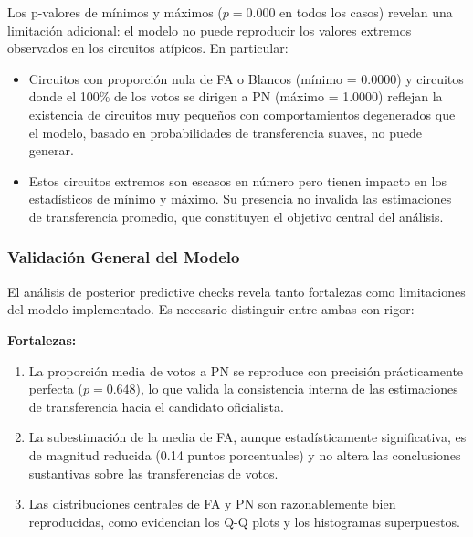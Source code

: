 Los p-valores de m\'inimos y m\'aximos ($p = 0.000$ en todos los casos) revelan una limitaci\'on adicional: el modelo no puede reproducir los valores extremos observados en los circuitos at\'ipicos. En particular:

\begin{itemize}
    \item Circuitos con proporci\'on nula de FA o Blancos (m\'inimo = 0.0000) y circuitos donde el 100\% de los votos se dirigen a PN (m\'aximo = 1.0000) reflejan la existencia de circuitos muy peque\~nos con comportamientos degenerados que el modelo, basado en probabilidades de transferencia suaves, no puede generar.

    \item Estos circuitos extremos son escasos en n\'umero pero tienen impacto en los estad\'isticos de m\'inimo y m\'aximo. Su presencia no invalida las estimaciones de transferencia promedio, que constituyen el objetivo central del an\'alisis.
\end{itemize}

\subsubsection{Validaci\'on General del Modelo}

El an\'alisis de posterior predictive checks revela tanto fortalezas como limitaciones del modelo implementado. Es necesario distinguir entre ambas con rigor:

\textbf{Fortalezas:}
\begin{enumerate}
    \item La proporci\'on media de votos a PN se reproduce con precisi\'on pr\'acticamente perfecta ($p = 0.648$), lo que valida la consistencia interna de las estimaciones de transferencia hacia el candidato oficialista.

    \item La subestimaci\'on de la media de FA, aunque estad\'isticamente significativa, es de magnitud reducida (0.14 puntos porcentuales) y no altera las conclusiones sustantivas sobre las transferencias de votos.

    \item Las distribuciones centrales de FA y PN son razonablemente bien reproducidas, como evidencian los Q-Q plots y los histogramas superpuestos.
\end{enumerate}

